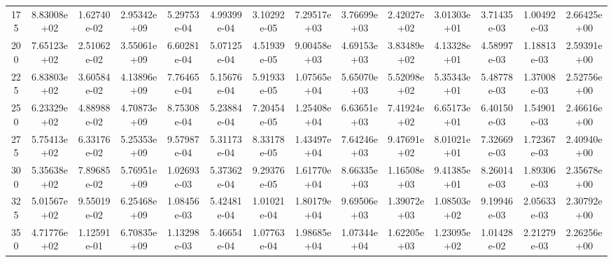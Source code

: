 \documentclass[
prb,
twocolumn,
superscriptaddress,
 amsmath,amssymb,
 aps,
longbibliography,
]{revtex4-2}
\begin{document}
\begin{table}[htbp!]
{\begin{tabular}{cccccccccccccc}
175 & 8.83008e+02 & 1.62740e-02 & 2.95342e+09 & 5.29753e-04 & 4.99399e-04 & 3.10292e-05 & 7.29517e+03 & 3.76699e+03 & 2.42027e+02 & 3.01303e+01 & 3.71435e-03 & 1.00492e-03 & 2.66425e+00 \\
200 & 7.65123e+02 & 2.51062e-02 & 3.55061e+09 & 6.60281e-04 & 5.07125e-04 & 4.51939e-05 & 9.00458e+03 & 4.69153e+03 & 3.83489e+02 & 4.13328e+01 & 4.58997e-03 & 1.18813e-03 & 2.59391e+00 \\
225 & 6.83803e+02 & 3.60584e-02 & 4.13896e+09 & 7.76465e-04 & 5.15676e-04 & 5.91933e-05 & 1.07565e+04 & 5.65070e+03 & 5.52098e+02 & 5.35343e+01 & 5.48778e-03 & 1.37008e-03 & 2.52756e+00 \\
250 & 6.23329e+02 & 4.88988e-02 & 4.70873e+09 & 8.75308e-04 & 5.23884e-04 & 7.20454e-05 & 1.25408e+04 & 6.63651e+03 & 7.41924e+02 & 6.65173e+01 & 6.40150e-03 & 1.54901e-03 & 2.46616e+00 \\
275 & 5.75413e+02 & 6.33176e-02 & 5.25353e+09 & 9.57987e-04 & 5.31173e-04 & 8.33178e-05 & 1.43497e+04 & 7.64246e+03 & 9.47691e+02 & 8.01021e+01 & 7.32669e-03 & 1.72367e-03 & 2.40940e+00 \\
300 & 5.35638e+02 & 7.89685e-02 & 5.76951e+09 & 1.02693e-03 & 5.37362e-04 & 9.29376e-05 & 1.61770e+04 & 8.66335e+03 & 1.16508e+03 & 9.41385e+01 & 8.26014e-03 & 1.89306e-03 & 2.35678e+00 \\
325 & 5.01567e+02 & 9.55019e-02 & 6.25468e+09 & 1.08456e-03 & 5.42481e-04 & 1.01021e-04 & 1.80179e+04 & 9.69506e+03 & 1.39072e+03 & 1.08503e+02 & 9.19946e-03 & 2.05633e-03 & 2.30792e+00 \\
350 & 4.71776e+02 & 1.12591e-01 & 6.70835e+09 & 1.13298e-03 & 5.46654e-04 & 1.07763e-04 & 1.98685e+04 & 1.07344e+04 & 1.62205e+03 & 1.23095e+02 & 1.01428e-02 & 2.21279e-03 & 2.26256e+00 \\
 \hline
  \end{tabular}
  }
\end{table}

\newpage
\end{document}
